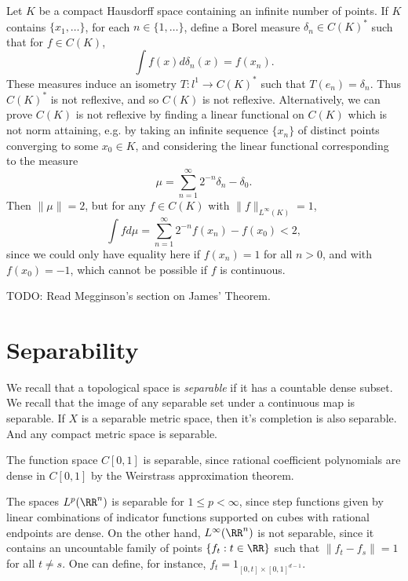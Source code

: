 \begin{example}
    Let $K$ be a compact Hausdorff space containing an infinite number of points. If $K$ contains $\{ x_1, \dots \}$, for each $n \in \{ 1, \dots \}$, define a Borel measure $\delta_n \in C(K)^*$ such that for $f \in C(K)$,
    \[ \int f(x) d \delta_n(x) = f(x_n). \]
    These measures induce an isometry $T: l^1 \to C(K)^*$ such that $T(e_n) = \delta_n$. Thus $C(K)^*$ is not reflexive, and so $C(K)$ is not reflexive. Alternatively, we can prove $C(K)$ is not reflexive by finding a linear functional on $C(K)$ which is not norm attaining, e.g. by taking an infinite sequence $\{ x_n \}$ of distinct points converging to some $x_0 \in K$, and considering the linear functional corresponding to the measure
    \[ \mu = \sum_{n = 1}^\infty 2^{-n} \delta_n - \delta_0. \]
    Then $\| \mu \| = 2$, but for any $f \in C(K)$ with $\| f \|_{L^\infty(K)} = 1$,
    \[ \int f d\mu = \sum_{n = 1}^\infty 2^{-n} f(x_n) - f(x_0) < 2, \]
    since we could only have equality here if $f(x_n) = 1$ for all $n > 0$, and with $f(x_0) = -1$, which cannot be possible if $f$ is continuous.
\end{example}

TODO: Read Megginson's section on James' Theorem.







\section{Separability}

We recall that a topological space is \emph{separable} if it has a countable dense subset. We recall that the image of any separable set under a continuous map is separable. If $X$ is a separable metric space, then it's completion is also separable. And any compact metric space is separable.

\begin{example}
    The function space $C[0,1]$ is separable, since rational coefficient polynomials are dense in $C[0,1]$ by the Weirstrass approximation theorem.
\end{example}

\begin{example}
    The spaces $L^p(\RR^n)$ is separable for $1 \leq p < \infty$, since step functions given by linear combinations of indicator functions supported on cubes with rational endpoints are dense. On the other hand, $L^\infty(\RR^n)$ is not separable, since it contains an uncountable family of points $\{ f_t : t \in \RR \}$ such that $\| f_t - f_s \| = 1$ for all $t \neq s$. One can define, for instance, $f_t = 1_{[0,t] \times [0,1]^{d-1}}$.
\end{example}

